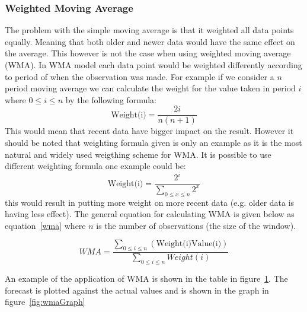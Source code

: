 \FloatBarrier
\subsubsection{Weighted Moving Average}
The problem with the simple moving average is that it weighted all data points equally. Meaning that both older and newer data would have the same effect on the average. This however is not the case when using weighted moving average (WMA). In WMA model each data point would be weighted differently according to period of when the observation was made. 
For example if we consider a $n$ period moving average we can calculate the weight for the value taken in period $i$ where $0\le i\le n$ by the following formula: \[\textrm{Weight(i)} = \frac{2i}{n(n+1)}\] This would mean that recent data have bigger impact on the result. However it should be noted that weighting formula given is only an example as it is the most natural and widely used weigthing scheme for WMA. It is possible to use different weighting formula one example could be: \[\textrm{Weight(i)} = \frac{2^i}{\sum_{0\le x\le n}2^x}\] this would result in putting more weight on more recent data (e.g. older data is having less effect). The general equation for calculating WMA is given below as equation~\ref{wma} where $n$ is the number of observations (the size of the window).

\begin{equation}\label{wma}
WMA = \frac{\sum_{0\le i\le n}(\textrm{Weight(i)}\textrm{Value(i)})}{\sum_{0\le i\le n}Weight(i)}
\end{equation}

An example of the application of WMA is shown in the table in figure~\ref{fig:wmaTable}. The forecast is plotted against the actual values and is shown in the graph in figure~\ref{fig:wmaGraph}

\begin{figure}[ht]
	\caption{}
	\label{fig:wmaTable}
\end{figure}

